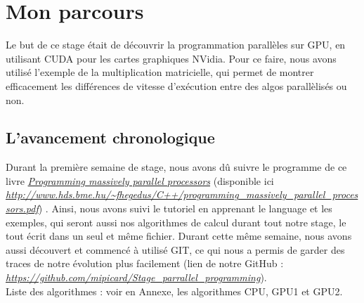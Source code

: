 \documentclass[a4paper,12pt]{article}
\begin{document}
{{	\section{Mon parcours}
	\indent Le but de ce stage \'e{}tait de d\'e{}couvrir la programmation parall\`eles sur GPU, en utilisant CUDA pour les cartes graphiques NVidia. Pour ce faire, nous avons utilis\'e l'exemple de la multiplication matricielle, qui permet de montrer efficacement les diff\'e{}rences de vitesse d'ex\'e{}cution entre des algos parall\`elis\'e{}s ou non.
	\subsection{L'avancement chronologique}
	\indent Durant la premi\`ere semaine de stage, nous avons d\^u suivre le programme de ce livre \href{http://www.hds.bme.hu/~fhegedus/C++/programming_massively_parallel_processors.pdf}{\textit{Programming massively parallel processors}} (disponible ici \textit{\url{http://www.hds.bme.hu/\~fhegedus/C++/programming_massively_parallel_processors.pdf}}) . Ainsi, nous avons suivi le tutoriel en apprenant le language et les exemples, qui seront aussi nos algorithmes de calcul durant tout notre stage, le tout \'e{}crit dans un seul et m\^eme fichier. Durant cette m\^eme semaine, nous avons aussi d\'e{}couvert et commenc\'e \`a utilis\'e GIT, ce qui nous a permis de garder des traces de notre \'evolution plus facilement (lien de notre GitHub : \textit{\url{https://github.com/mipicard/Stage_parrallel_programming}}).\\
	Liste des algorithmes : voir en Annexe, les algorithmes CPU, GPU1 et GPU2.
	
}}
\end{document}
